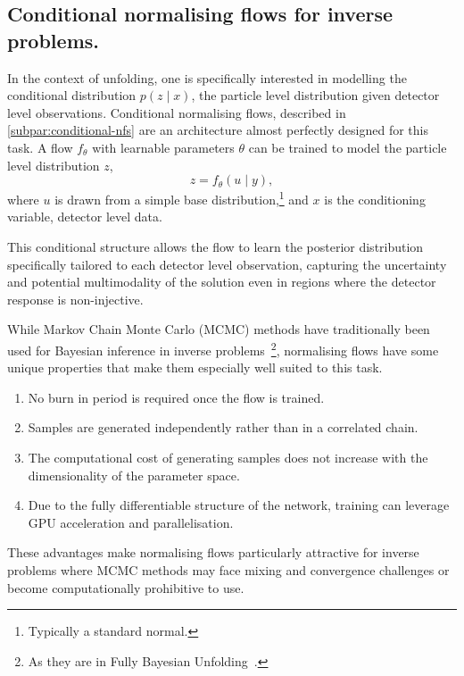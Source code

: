 \subsection{Conditional normalising flows for inverse problems.}
    In the context of unfolding, one is specifically interested in modelling the conditional distribution $p(z\mid x)$, the particle level distribution given detector level observations.
    Conditional normalising flows, described in \cref{subpar:conditional-nfs} are an architecture almost perfectly designed for this task.
    A flow \(f_\theta\) with learnable parameters \(\theta\) can be trained to model the particle level distribution \(z\),
    \[
        z = f_\theta(u\mid y),
    \]
    where $u$ is drawn from a simple base distribution,\footnote{Typically a standard normal.} and $x$ is the conditioning variable, detector level data.
    
    This conditional structure allows the flow to learn the posterior distribution specifically tailored to each detector level observation, capturing the uncertainty and potential multimodality of the solution even in regions where the detector response is non-injective.

    While Markov Chain Monte Carlo (MCMC) methods have traditionally been used for Bayesian inference in inverse problems~\cite{Kaipio2005StatisticalProblems, Segura2024APhysics, Dashti2017TheProblems, 2005InverseMeasurements, 2005StatisticalTheory}\footnote{As they are in Fully Bayesian Unfolding~\cite{choudalakis_fully_2012}.}, normalising flows have some unique properties that make them especially well suited to this task.
    \begin{enumerate}
        \item  No burn in period is required once the flow is trained.
        \item Samples are generated independently rather than in a correlated chain.
        \item The computational cost of generating samples does not increase with the dimensionality of the parameter space.
        \item Due to the fully differentiable structure of the network, training can leverage GPU acceleration and parallelisation.
    \end{enumerate}
    
    These advantages make normalising flows particularly attractive for inverse problems where MCMC methods may face mixing and convergence challenges or become computationally prohibitive to use.
